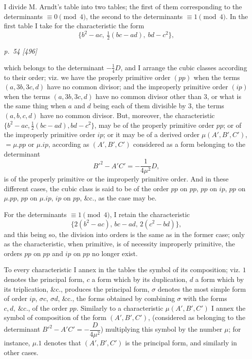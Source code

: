 ﻿\documentclass[11pt,a4paper]{article}
\theoremstyle{plain}
\theoremstyle{definition}
\begin{document}
I divide M. Arndt's table into two tables; the first of them corresponding
to the determinants \(\equiv0\pmod 4\), the second to the determinants
\(\equiv1\pmod 4\). In the first table I take for the characteristic the
form
\[
\{b^2-ac,\ \tfrac12(bc-ad),\ bd-c^2\},
\]

\clearpage
\textit{p.~54 [496]}

which belongs to the determinant \(-\tfrac14D\), and I arrange the cubic
classes according to their order; viz. we have the properly primitive
order \((pp)\) when the terms \((a,3b,3c,d)\) have no common divisor; and
the improperly primitive order \((ip)\) when the terms \((a,3b,3c,d)\)
have no common divisor other than \(3\), or what is the same thing when
\(a\) and \(d\) being each of them divisible by \(3\), the terms
\((a,b,c,d)\) have no common divisor. But, moreover, the characteristic
\(\{b^2-ac,\tfrac12(bc-ad),bd-c^2\}\), may be of the properly primitive
order \(pp\); or of the improperly primitive order \(ip\); or it may be of
a derived order \(\mu(A',B',C')\), \(=\mu.pp\) or \(\mu.ip\), according as
\((A',B',C')\) considered as a form belonging to the determinant
\[
B'^2-A'C'=-\frac{1}{4\mu^2}D,
\]
is of the properly primitive or the improperly primitive order. And in
these different cases, the cubic class is said to be of the order \(pp\)
on \(pp\), \(pp\) on \(ip\), \(pp\) on \(\mu.pp\), \(pp\) on \(\mu.ip\),
\(ip\) on \(pp\), \&c., as the case may be.

For the determinants \(\equiv1\pmod 4\), I retain the characteristic
\[
\{2(b^2-ac),\,bc-ad,\,2(c^2-bd)\},
\]
and this being so, the division into orders is the same as in the former
case; only as the characteristic, when primitive, is of necessity
improperly primitive, the orders \(pp\) on \(pp\) and \(ip\) on \(pp\) no
longer exist.

To every characteristic I annex in the tables the symbol of its
composition; viz. \(1\) denotes the principal form, \(c\) a form which by
its duplication, \(d\) a form which by its triplication, \&c., produces the
principal form, \(\sigma\) denotes the most simple form of order \(ip\),
\(\sigma c\), \(\sigma d\), \&c., the forms obtained by combining
\(\sigma\) with the forms \(c,d,\ \&c.\), of the order \(pp\). Similarly to
a characteristic \(\mu(A',B',C')\) I annex the symbol of composition of the
form \((A',B',C')\), (considered as belonging to the determinant
\(B'^2-A'C'=-\dfrac{D}{4\mu^2}\)) multiplying this symbol by the number
\(\mu\); for instance, \(\mu.1\) denotes that \((A',B',C')\) is the
principal form, and similarly in other cases.
\end{document}

